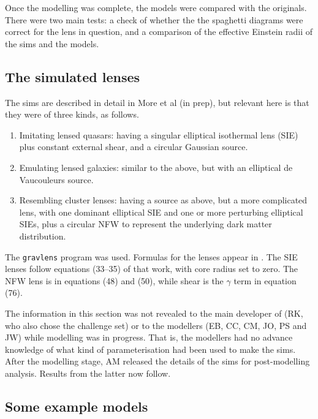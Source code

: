 Once the modelling was complete, the models were compared with the
originals.  There were two main tests: a check of whether the the
spaghetti diagrams were correct for the lens in question, and a
comparison of the effective Einstein radii of the sims and the models.

\subsection{The simulated lenses} \label{sec:sims}

The \sw sims are described in detail in More et al (in prep), but
relevant here is that they were of three kinds, as follows.

\begin{enumerate}
  \item Imitating lensed quasars: having a singular elliptical
    isothermal lens (SIE) plus constant external shear, and a circular
    Gaussian source.
  \item Emulating lensed galaxies: similar to the above, but with an
    elliptical de Vaucouleurs source.
  \item Resembling cluster lenses: having a source as above, but a
    more complicated lens, with one dominant elliptical SIE and
    one or more perturbing elliptical SIEs, plus a circular NFW
    \citep{1996ApJ...462..563N,1997ApJ...490..493N} to represent
    the underlying dark matter distribution.
\end{enumerate}
The {\tt gravlens} program \citep{2001astro.ph..2340K} was used.
Formulas for the lenses appear in \cite{2001astro.ph..2341K}. The SIE
lenses follow equations (33--35) of that work, with core radius set to
zero.  The NFW lens is in equations (48) and (50), while shear is the
$\gamma$ term in equation (76).

The information in this section was not revealed to the main developer
of \spl (RK, who also chose the challenge set) or to the modellers
(EB, CC, CM, JO, PS and JW) while modelling was in progress.  That is,
the modellers had no advance knowledge of what kind of
parameterisation had been used to make the sims.  After the modelling
stage, AM released the details of the sims for post-modelling
analysis.  Results from the latter now follow.

\subsection{Some example models} \label{sec:example_models}

